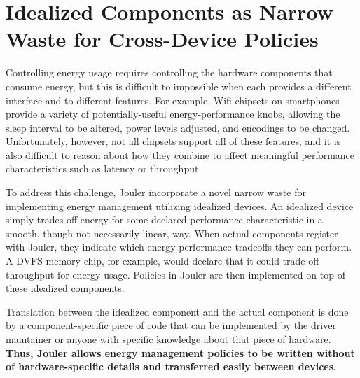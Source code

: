 \section{Idealized Components as Narrow Waste for Cross-Device Policies}

Controlling energy usage requires controlling the hardware components that
consume energy, but this is difficult to impossible when each provides a
different interface and to different features. For example, Wifi chipsets on
smartphones provide a variety of potentially-useful energy-performance knobs,
allowing the sleep interval to be altered, power levels adjusted, and
encodings to be changed. Unfortunately, however, not all chipsets support all
of these features, and it is also difficult to reason about how they combine
to affect meaningful performance characteristics such as latency or
throughput.

To address this challenge, Jouler incorporate a novel narrow waste for
implementing energy management utilizing idealized devices. An idealized
device simply trades off energy for some declared performance characteristic
in a smooth, though not necessarily linear, way. When actual components
register with Jouler, they indicate which energy-performance tradeoffs they
can perform. A DVFS memory chip, for example, would declare that it could
trade off throughput for energy usage. Policies in Jouler are then
implemented on top of these idealized components.

Translation between the idealized component and the actual component is done
by a component-specific piece of code that can be implemented by the driver
maintainer or anyone with specific knowledge about that piece of hardware.
\textbf{Thus, Jouler allows energy management policies to be written without
of hardware-specific details and transferred easily between devices.}

